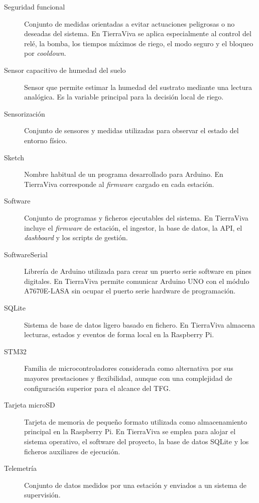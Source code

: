 \begin{description}
    \item[Seguridad funcional]
    Conjunto de medidas orientadas a evitar actuaciones peligrosas o no deseadas del sistema. En TierraViva se aplica especialmente al control del relé, la bomba, los tiempos máximos de riego, el modo seguro y el bloqueo por \textit{cooldown}.

    \item[Sensor capacitivo de humedad del suelo]
    Sensor que permite estimar la humedad del sustrato mediante una lectura analógica. Es la variable principal para la decisión local de riego.

    \item[Sensorización]
    Conjunto de sensores y medidas utilizadas para observar el estado del entorno físico.

    \item[Sketch]
    Nombre habitual de un programa desarrollado para Arduino. En TierraViva corresponde al \textit{firmware} cargado en cada estación.

    \item[Software]
    Conjunto de programas y ficheros ejecutables del sistema. En TierraViva incluye el \textit{firmware} de estación, el ingestor, la base de datos, la API, el \textit{dashboard} y los scripts de gestión.

    \item[SoftwareSerial]
    Librería de Arduino utilizada para crear un puerto serie software en pines digitales. En TierraViva permite comunicar Arduino UNO con el módulo A7670E-LASA sin ocupar el puerto serie hardware de programación.

    \item[SQLite]
    Sistema de base de datos ligero basado en fichero. En TierraViva almacena lecturas, estados y eventos de forma local en la Raspberry Pi.

    \item[STM32]
    Familia de microcontroladores considerada como alternativa por sus mayores prestaciones y flexibilidad, aunque con una complejidad de configuración superior para el alcance del TFG.

    \item[Tarjeta microSD]
    Tarjeta de memoria de pequeño formato utilizada como almacenamiento principal en la Raspberry Pi. En TierraViva se emplea para alojar el sistema operativo, el software del proyecto, la base de datos SQLite y los ficheros auxiliares de ejecución.

    \item[Telemetría]
    Conjunto de datos medidos por una estación y enviados a un sistema de supervisión.


\end{description}
